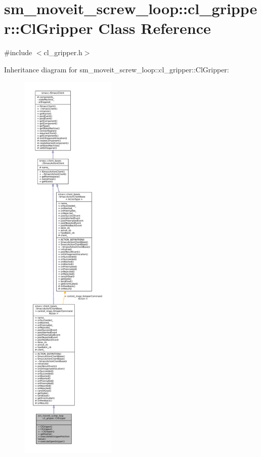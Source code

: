\hypertarget{classsm__moveit__screw__loop_1_1cl__gripper_1_1ClGripper}{}\section{sm\+\_\+moveit\+\_\+screw\+\_\+loop\+:\+:cl\+\_\+gripper\+:\+:Cl\+Gripper Class Reference}
\label{classsm__moveit__screw__loop_1_1cl__gripper_1_1ClGripper}


{\ttfamily \#include $<$cl\+\_\+gripper.\+h$>$}



Inheritance diagram for sm\+\_\+moveit\+\_\+screw\+\_\+loop\+:\+:cl\+\_\+gripper\+:\+:Cl\+Gripper\+:
\nopagebreak
\begin{figure}[H]
\begin{center}
\leavevmode
\includegraphics[height=550pt]{classsm__moveit__screw__loop_1_1cl__gripper_1_1ClGripper__inherit__graph}
\end{center}
\end{figure}


